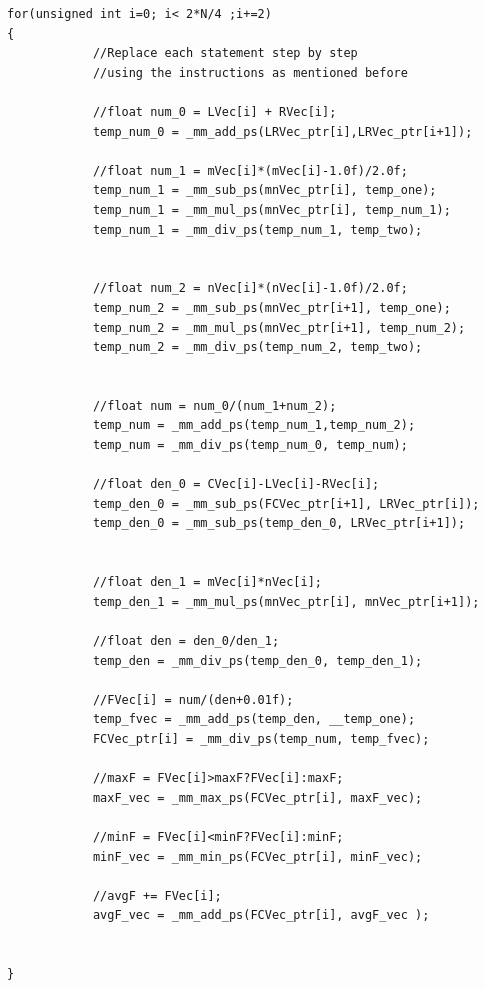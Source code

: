 \documentclass{article}
\begin{document}
\begin{lstlisting}
for(unsigned int i=0; i< 2*N/4 ;i+=2)
{
            //Replace each statement step by step 
            //using the instructions as mentioned before

            //float num_0 = LVec[i] + RVec[i];
            temp_num_0 = _mm_add_ps(LRVec_ptr[i],LRVec_ptr[i+1]);

            //float num_1 = mVec[i]*(mVec[i]-1.0f)/2.0f;
            temp_num_1 = _mm_sub_ps(mnVec_ptr[i], temp_one);
            temp_num_1 = _mm_mul_ps(mnVec_ptr[i], temp_num_1);
            temp_num_1 = _mm_div_ps(temp_num_1, temp_two);


            //float num_2 = nVec[i]*(nVec[i]-1.0f)/2.0f;
            temp_num_2 = _mm_sub_ps(mnVec_ptr[i+1], temp_one);
            temp_num_2 = _mm_mul_ps(mnVec_ptr[i+1], temp_num_2);
            temp_num_2 = _mm_div_ps(temp_num_2, temp_two);


            //float num = num_0/(num_1+num_2);
            temp_num = _mm_add_ps(temp_num_1,temp_num_2);
            temp_num = _mm_div_ps(temp_num_0, temp_num);

            //float den_0 = CVec[i]-LVec[i]-RVec[i];
            temp_den_0 = _mm_sub_ps(FCVec_ptr[i+1], LRVec_ptr[i]);
            temp_den_0 = _mm_sub_ps(temp_den_0, LRVec_ptr[i+1]);


            //float den_1 = mVec[i]*nVec[i];
            temp_den_1 = _mm_mul_ps(mnVec_ptr[i], mnVec_ptr[i+1]);

            //float den = den_0/den_1;
            temp_den = _mm_div_ps(temp_den_0, temp_den_1);

            //FVec[i] = num/(den+0.01f);
            temp_fvec = _mm_add_ps(temp_den, __temp_one);
            FCVec_ptr[i] = _mm_div_ps(temp_num, temp_fvec);

            //maxF = FVec[i]>maxF?FVec[i]:maxF;
            maxF_vec = _mm_max_ps(FCVec_ptr[i], maxF_vec);

            //minF = FVec[i]<minF?FVec[i]:minF;
            minF_vec = _mm_min_ps(FCVec_ptr[i], minF_vec);

            //avgF += FVec[i];
            avgF_vec = _mm_add_ps(FCVec_ptr[i], avgF_vec );


}
\end{lstlisting}
\newpage
\end{document}
